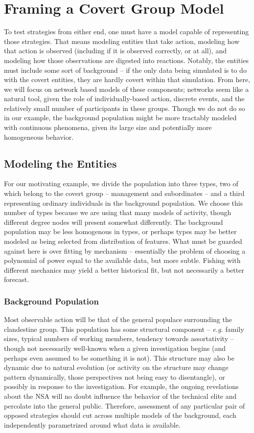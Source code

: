 \documentclass{article}
\begin{document}
\section*{Framing a Covert Group Model}
To test strategies from either end, one must have a model capable of representing those strategies.  That means modeling entities that take action, modeling how that action is observed (including if it is observed correctly, or at all), and modeling how those observations are digested into reactions.  Notably, the entities must include some sort of background -- if the only data being simulated is to do with the covert entities, they are hardly covert within that simulation.  From here, we will focus on network based models of these components; networks seem like a natural tool, given the role of individually-based action, discrete events, and the relatively small number of participants in these groups.  Though we do not do so in our example, the background population might be more tractably modeled with continuous phenomena, given its large size and potentially more homogeneous behavior.

\subsection*{Modeling the Entities}
For our motivating example, we divide the population into three types, two of which belong to the covert group -- management and subordinates -- and a third representing ordinary individuals in the background population.  We choose this number of types because we are using that many models of activity, though different degree nodes will present somewhat differently.  The background population may be less homogenous in types, or perhaps types may be better modeled as being selected from distribution of features.  What must be guarded against here is over fitting by mechanism -- essentially the problem of choosing a polynomial of power equal to the available data, but more subtle.  Fishing with different mechanics may yield a better historical fit, but not necessarily a better forecast.

\subsubsection*{Background Population}
Most observable action will be that of the general populace surrounding the clandestine group.  This population has some structural component -- {\em e.g.} family sizes, typical numbers of working members, tendency towards assortativity -- though not necessarily well-known when a given investigation begins (and perhaps even assumed to be something it is not).  This structure may also be dynamic due to natural evolution (or activity on the structure may change pattern dynamically, those perspectives not being easy to disentangle), or possibly in response to the investigation.  For example, the ongoing revelations about the NSA will no doubt influence the behavior of the technical elite and percolate into the general public.  Therefore, assessment of any particular pair of opposed strategies should cut across multiple models of the background, each independently parametrized around what data is available.
\end{document}
